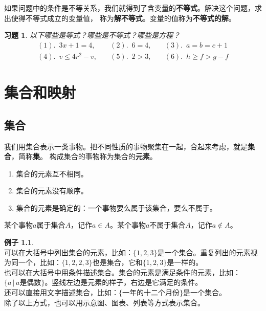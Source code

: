 \documentclass[12pt,UTF8]{ctexbook}
\theoremstyle{definition}
\newtheorem{ex}{例子}[section]
\theoremstyle{plain}
\newtheorem{xt}{习题}[section]
\begin{document}
如果问题中的条件是不等关系，我们就得到了含变量的\textbf{不等式}。解决这个问题，求出使得不等式成立的变量值，
称为\textbf{解不等式}。变量的值称为\textbf{不等式的解}。

\begin{xt}\label{xt:1-2-0}
    以下哪些是等式？哪些是不等式？哪些是方程？
    $$
    \begin{array}{lll}
        (1). \,\,\, 3x + 1 = 4, \quad & (2). \,\,\, 6 = 4, \quad & (3). \,\,\, a = b = c+1  \\
        (4). \,\,\, v \leqslant 4r^2 - v, \quad & (5). \,\,\, 2 > 3, \quad & (6). \,\,\, h \geqslant f > g - f 
    \end{array}
    $$
\end{xt}

\chapter{集合和映射}
\section{集合}
我们用集合表示一类事物。把不同性质的事物聚集在一起，合起来考虑，就是\textbf{集合}，简称\textbf{集}。
构成集合的事物称为集合的\textbf{元素}。
\begin{enumerate}
    \item 集合的元素互不相同。
    \item 集合的元素没有顺序。
    \item 集合的元素是确定的：一个事物要么属于该集合，要么不属于。
\end{enumerate}

某个事物$a$属于集合$A$，记作$a\in A$。某个事物$a$不属于集合$A$，记作$a\notin A$。

\begin{ex}\label{ex:2-0-0}
    \mbox{} \\ 
    \indent 可以在大括号中列出集合的元素，比如：$\{1,2,3\}$是一个集合。重复列出的元素视为同一个，比如：$\{1,2,2,3\}$也是集合，它和$\{1,2,3\}$是一样的。 \\
    \indent 也可以在大括号中用条件描述集合。集合的元素是满足条件的元素，比如：$\{ a\, |\, a\mbox{是偶数}\}$。竖线左边是元素的样子，右边是它满足的条件。\\
    \indent 还可以直接用文字描述集合，比如：$\{\mbox{一年的十二个月份}\}$是一个集合。\\
    \indent 除了以上方式，也可以用示意图、图表、列表等方式表示集合。
\end{ex}
\end{document}
